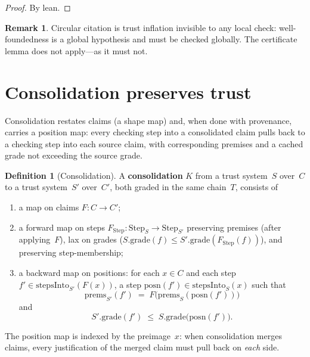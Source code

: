 \documentclass[11pt,a4paper]{article}
\theoremstyle{plain}
\theoremstyle{definition}
\newtheorem{definition}[theorem]{Definition}
\newtheorem{remark}[theorem]{Remark}
\begin{document}
\begin{proof}
By lean.
\end{proof}

\begin{remark}
Circular citation is trust inflation invisible to any local check:
well-foundedness is a global hypothesis and must be checked globally. The
certificate lemma does not apply---as it must not.
\end{remark}

\section{Consolidation preserves trust}

Consolidation restates claims (a shape map) and, when done with provenance,
carries a position map: every checking step into a consolidated claim pulls
back to a checking step into each source claim, with corresponding
premises and a cached grade not exceeding the source grade.

\begin{definition}[Consolidation]\label{def:consolidation}
A \textbf{consolidation} $K$ from a trust system~$S$ over~$C$ to a trust
system~$S'$ over~$C'$, both graded in the same chain~$T$, consists of
\begin{enumerate}
  \item a map on claims $F : C \to C'$;
  \item a forward map on steps $F_{\mathrm{Step}} : \mathrm{Step}_S \to
        \mathrm{Step}_{S'}$ preserving premises (after applying~$F$),
        lax on grades ($S.\mathrm{grade}(f) \le
        S'.\mathrm{grade}(F_{\mathrm{Step}}(f))$), and preserving
        step-membership;
  \item a backward map on positions: for each $x \in C$ and each step
        $f' \in \mathrm{stepsInto}_{S'}(F(x))$, a step
        $\mathrm{posn}(f') \in \mathrm{stepsInto}_S(x)$ such that
        \[
          \mathrm{prems}_{S'}(f')
          \;=\;
          F\bigl(\mathrm{prems}_S(\mathrm{posn}(f'))\bigr)
        \]
        and
        \[
          S'.\mathrm{grade}(f')
          \;\le\;
          S.\mathrm{grade}\bigl(\mathrm{posn}(f')\bigr).
        \]
\end{enumerate}
The position map is indexed by the preimage~$x$: when consolidation merges
claims, every justification of the merged claim must pull back on
\emph{each} side.
\end{definition}
\end{document}
